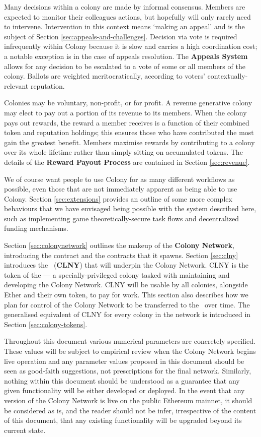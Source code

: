 Many decisions within a colony are made by informal consensus. Members are expected to monitor their colleagues actions, but hopefully will only rarely need to intervene. Intervention in this context means `making an appeal' and is the subject of Section \ref{sec:appeals-and-challenges}. Decision via vote is required infrequently within Colony because it is slow and carries a high coordination cost; a notable exception is in the case of appeals resolution. The \textbf{Appeals System} allows for any decision to be escalated to a vote of some or all members of the colony. Ballots are weighted meritocratically, according to voters' contextually-relevant reputation.

Colonies may be voluntary, non-profit, or for profit. A revenue generative colony may elect to pay out a portion of its revenue to its members. When the colony pays out rewards, the reward a member receives is a function of their combined token and reputation holdings; this ensures those who have contributed the most gain the greatest benefit. Members maximise rewards by contributing to a colony over its whole lifetime rather than simply sitting on accumulated tokens. The details of the \textbf{Reward Payout Process} are contained in Section \ref{sec:revenue}.

We of course want people to use Colony for as many different workflows as possible, even those that are not immediately apparent as being able to use Colony. Section \ref{sec:extensions} provides an outline of some more complex behaviours that we have envisaged being possible with the system described here, such as implementing game theoretically-secure task flows and decentralized funding mechanisms.

Section \ref{sec:colonynetwork} outlines the makeup of the \textbf{Colony Network}, introducing the  contract and the  contracts that it spawns. Section \ref{sec:clny} introduces the \rcts\ (\textbf{CLNY}) that will underpin the Colony Network. CLNY is the token of the \textbf{\rc} --- a specially-privileged colony tasked with maintaining and developing the Colony Network. CLNY will be usable by all colonies, alongside Ether and their own token, to pay for work. This section also describes how we plan for control of the Colony Network to be transferred to the \rc\ over time. The generalised equivalent of CLNY for every colony in the network is introduced in Section \ref{sec:colony-tokens}.

Throughout this document various numerical parameters are concretely specified. These values will be subject to empirical review when the Colony Network begins live operation and any parameter values proposed in this document should be seen as good-faith suggestions, not prescriptions for the final network. Similarly, nothing within this document should be understood as a guarantee that any given functionality will be either developed or deployed. In the event that any version of the Colony Network is live on the public Ethereum mainnet, it should be considered as is, and the reader should not be infer, irrespective of the content of this document, that any existing functionality will be upgraded beyond its current state.
